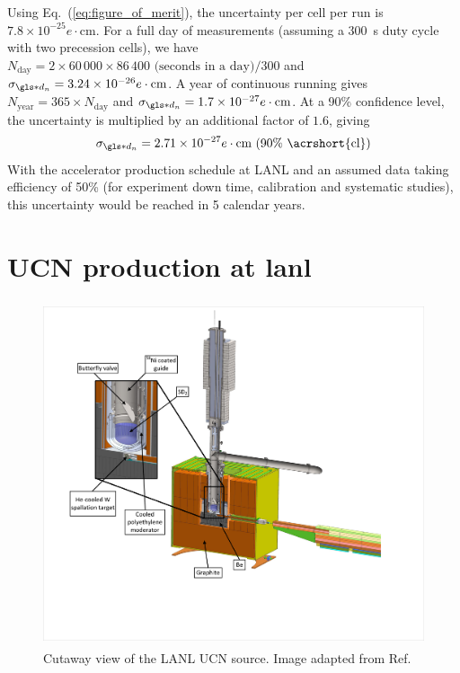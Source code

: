 Using Eq.~(\ref{eq:figure_of_merit}), the uncertainty per cell per run is $7.8 \times 10^{-25}e\cdot\text{cm}$. For a full day of measurements (assuming a \qty{300}{\s} duty cycle with two precession cells), we have $N_\text{day}=2\times60\,000\times86\,400\text{ (seconds in a day)}/300$ and $\sigma_{\gls*{d_n}}=3.24\times10^{-26}e\cdot\text{cm}$. A year of continuous running gives $N_\text{year}=365\times N_\text{day}$ and $\sigma_{\gls*{d_n}}=1.7\times10^{-27}e\cdot\text{cm}$. At a 90\% confidence level, the uncertainty is multiplied by an additional factor of $1.6$, giving
%
\begin{gather}
    \sigma_{\gls*{d_n}}=2.71\times10^{-27}e\cdot\text{cm (90\% \acrshort{cl})}
\end{gather}
%
With the accelerator production schedule at LANL and an assumed data taking efficiency of 50\% (for experiment down time, calibration and systematic studies), this uncertainty would be reached in 5 calendar years.


\section
{
    \texorpdfstring{UCN production at \acrshort{lanl}}
                   {UCN production at LANL}
}\label{sec:lanl_ucn_source}


\begin{figure}
    \centering
    \includegraphics[height=4in]{figures/lanl_ucn_source.pdf}
    \caption[Cutaway view of the LANL UCN source]
    {Cutaway view of the LANL UCN source. Image adapted from Ref.~\cite{ito_performance_2018}}
    \label{fig:lanl_ucn_source}
\end{figure}

